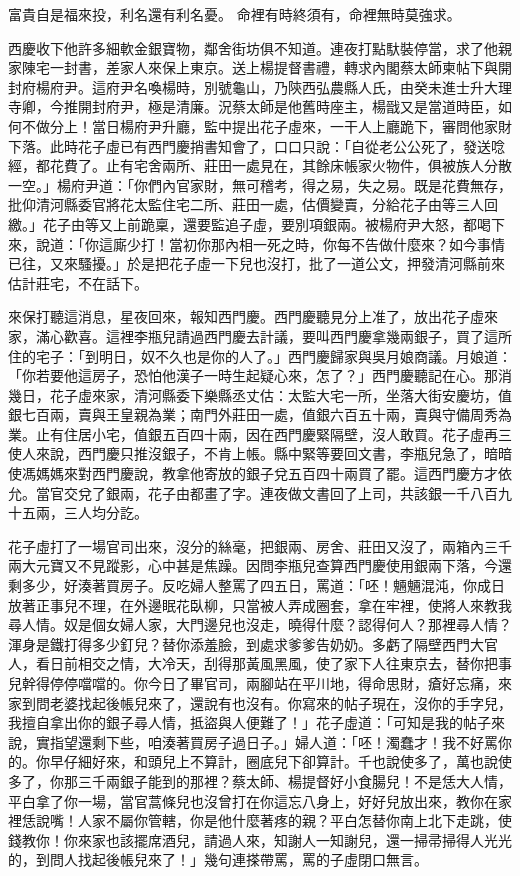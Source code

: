 富貴自是福來投，利名還有利名憂。
命裡有時終須有，命裡無時莫強求。

西慶收下他許多細軟金銀寶物，鄰舍街坊俱不知道。連夜打點馱裝停當，求了他親家陳宅一封書，差家人來保上東京。送上楊提督書禮，轉求內閣蔡太師柬帖下與開封府楊府尹。這府尹名喚楊時，別號龜山，乃陝西弘農縣人氏，由癸未進士升大理寺卿，今推開封府尹，極是清廉。況蔡太師是他舊時座主，楊戩又是當道時臣，如何不做分上！當日楊府尹升廳，監中提出花子虛來，一干人上廳跪下，審問他家財下落。此時花子虛已有西門慶捎書知會了，口口只說：「自從老公公死了，發送唸經，都花費了。止有宅舍兩所、莊田一處見在，其餘床帳家火物件，俱被族人分散一空。」楊府尹道：「你們內官家財，無可稽考，得之易，失之易。既是花費無存，批仰清河縣委官將花太監住宅二所、莊田一處，估價變賣，分給花子由等三人回繳。」花子由等又上前跪稟，還要監追子虛，要別項銀兩。被楊府尹大怒，都喝下來，說道：「你這廝少打！當初你那內相一死之時，你每不告做什麼來？如今事情已往，又來騷擾。」於是把花子虛一下兒也沒打，批了一道公文，押發清河縣前來估計莊宅，不在話下。

來保打聽這消息，星夜回來，報知西門慶。西門慶聽見分上准了，放出花子虛來家，滿心歡喜。這裡李瓶兒請過西門慶去計議，要叫西門慶拿幾兩銀子，買了這所住的宅子：「到明日，奴不久也是你的人了。」西門慶歸家與吳月娘商議。月娘道：「你若要他這房子，恐怕他漢子一時生起疑心來，怎了？」西門慶聽記在心。那消幾日，花子虛來家，清河縣委下樂縣丞丈估：太監大宅一所，坐落大街安慶坊，值銀七百兩，賣與王皇親為業；南門外莊田一處，值銀六百五十兩，賣與守備周秀為業。止有住居小宅，值銀五百四十兩，因在西門慶緊隔壁，沒人敢買。花子虛再三使人來說，西門慶只推沒銀子，不肯上帳。縣中緊等要回文書，李瓶兒急了，暗暗使馮媽媽來對西門慶說，教拿他寄放的銀子兌五百四十兩買了罷。這西門慶方才依允。當官交兌了銀兩，花子由都畫了字。連夜做文書回了上司，共該銀一千八百九十五兩，三人均分訖。

花子虛打了一場官司出來，沒分的絲毫，把銀兩、房舍、莊田又沒了，兩箱內三千兩大元寶又不見蹤影，心中甚是焦躁。因問李瓶兒查算西門慶使用銀兩下落，今還剩多少，好湊著買房子。反吃婦人整罵了四五日，罵道：「呸！魎魎混沌，你成日放著正事兒不理，在外邊眠花臥柳，只當被人弄成圈套，拿在牢裡，使將人來教我尋人情。奴是個女婦人家，大門邊兒也沒走，曉得什麼？認得何人？那裡尋人情？渾身是鐵打得多少釘兒？替你添羞臉，到處求爹爹告奶奶。多虧了隔壁西門大官人，看日前相交之情，大冷天，刮得那黃風黑風，使了家下人往東京去，替你把事兒幹得停停噹噹的。你今日了畢官司，兩腳站在平川地，得命思財，瘡好忘痛，來家到問老婆找起後帳兒來了，還說有也沒有。你寫來的帖子現在，沒你的手字兒，我擅自拿出你的銀子尋人情，抵盜與人便難了！」花子虛道：「可知是我的帖子來說，實指望還剩下些，咱湊著買房子過日子。」婦人道：「呸！濁蠢才！我不好罵你的。你早仔細好來，和頭兒上不算計，圈底兒下卻算計。千也說使多了，萬也說使多了，你那三千兩銀子能到的那裡？蔡太師、楊提督好小食腸兒！不是恁大人情，平白拿了你一場，當官蒿條兒也沒曾打在你這忘八身上，好好兒放出來，教你在家裡恁說嘴！人家不屬你管轄，你是他什麼著疼的親？平白怎替你南上北下走跳，使錢教你！你來家也該擺席酒兒，請過人來，知謝人一知謝兒，還一掃帚掃得人光光的，到問人找起後帳兒來了！」幾句連搽帶罵，罵的子虛閉口無言。


